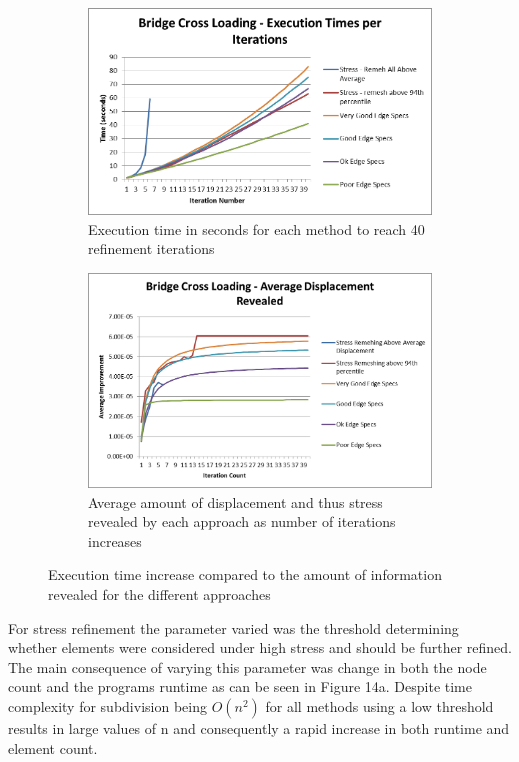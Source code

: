 \begin{figure}[!h]
\centering
\begin{subfigure}{.5\textwidth}
  \centering
  \includegraphics[width=0.9\linewidth]{../Graphics/Graphs/BridgeCrossLoadingExecutionTimesPerIterations.png}
  \caption{Execution time in seconds for each method to reach 40 refinement iterations}
  \label{fig:sub1}
\end{subfigure}%
\begin{subfigure}{.5\textwidth}
  \centering
  \includegraphics[width=0.9\linewidth]{../Graphics/Graphs/BridgeCrossLoadingAverageDisplacementRevealed.png}
  \caption{Average amount of displacement and thus stress revealed by each approach as number of iterations increases}
  \label{fig:sub2}
\end{subfigure}
\label{fig:test}
  \caption{Execution time increase compared to the amount of information revealed for the different approaches}
 \end{figure}

\noindent
For stress refinement the parameter varied was the threshold determining whether elements were considered under high stress and should be further refined. The main consequence of varying this parameter was change in both the node count and the programs runtime as can be seen in Figure 14a. Despite time complexity for subdivision being $O(n^2)$ for all methods using a low threshold results in large values of n and consequently a rapid increase in both runtime and element count. \\

